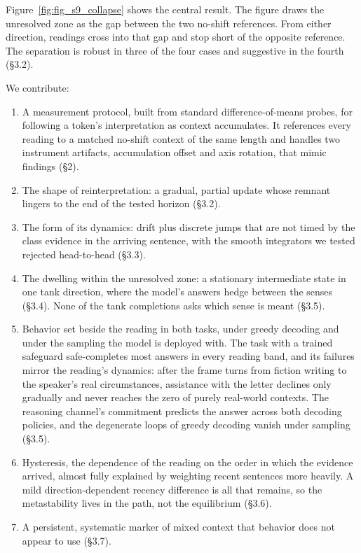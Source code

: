 \documentclass[11pt]{article}
\begin{document}
Figure~\ref{fig:fig_s9_collapse} shows the central result. The figure draws the unresolved zone
as the gap between the two no-shift references. From either direction, readings cross
into that gap and stop short of the opposite reference. The separation is robust in
three of the four cases and suggestive in the fourth (\S3.2).

We contribute:

\begin{enumerate}
\item A measurement protocol, built from standard difference-of-means probes, for
following a token's interpretation as context accumulates. It references every
reading to a matched no-shift context of the same length and handles two
instrument artifacts, accumulation offset and axis rotation, that mimic findings
(\S2).
\item The shape of reinterpretation: a gradual, partial update whose remnant lingers to
the end of the tested horizon (\S3.2).
\item The form of its dynamics: drift plus discrete jumps that are not timed by the class evidence in the arriving sentence, with the smooth integrators we tested rejected head-to-head (\S3.3).
\item The dwelling within the unresolved zone: a stationary intermediate state in one
tank direction, where the model's answers hedge between the senses (\S3.4). None of the tank completions asks which sense is meant (\S3.5).
\item Behavior set beside the reading in both tasks, under greedy decoding and under the sampling the model is deployed with. The task with a trained safeguard safe-completes most answers in every reading band, and its failures mirror the reading's dynamics: after the frame turns from fiction writing to the speaker's real circumstances, assistance with the letter declines only gradually and never reaches the zero of purely real-world contexts. The reasoning channel's commitment predicts the answer across both decoding policies, and the degenerate loops of greedy decoding vanish under sampling (\S3.5).
\item Hysteresis, the dependence of the reading on the order in which the evidence
arrived, almost fully explained by weighting recent sentences more heavily. A mild
direction-dependent recency difference is all that remains, so the metastability
lives in the path, not the equilibrium (\S3.6).
\item A persistent, systematic marker of mixed context that behavior does not appear to
use (\S3.7).
\end{enumerate}
\end{document}
